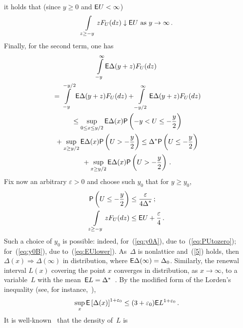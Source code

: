 \begin{multicols}{2}
it holds that (since $y\ge0$ and ${\sf E} U<\infty$)
 \begin{equation}
\int\limits_{z\ge-y}zF_{U}(dz)\downarrow{\sf E} U\,\,\mbox{as}\,\,
y\to\infty\,.\label{eq:EUlower}
\end{equation}
Finally, for the second term, one has
\begin{multline*}
\int\limits_{-y}^{\infty}{\sf E}\Delta(y+z)F_{U}(dz)  \\
{}=  \int\limits_{-y}^{-y/2}{\sf 
E}\Delta(y+z)F_{U}(dz)
 +\int\limits_{-y/2}^{\infty}{\sf E}\Delta(y+z)F_{U}(dz) \\
{} \le  \sup\limits_{0\le x\le y/2}{\sf E}\Delta(x){\sf P}\left(-y<U\le-\displaystyle\frac{\displaystyle y\mathstrut}{\displaystyle 2\mathstrut}\right)\\
{}+ \sup\limits_{x\ge y/2}{\sf E}\Delta(x){\sf P}\left(U>-\displaystyle\frac{\displaystyle y\mathstrut}{\displaystyle 2\mathstrut}\right)
\le \Delta^{*}{\sf P}\left(U\le-\displaystyle\frac{\displaystyle y\mathstrut}{\displaystyle 2\mathstrut}\right)\\
{}+ \sup\limits_{x\ge y/2}{\sf E}\Delta(x){\sf 
P}\left(U>-\displaystyle\frac{\displaystyle y\mathstrut}{\displaystyle 2\mathstrut}\right)\,.
\end{multline*}
 Fix now an arbitrary $\varepsilon>0$ and choose  such $y_{0}$ that
 for $y\ge y_{0}$,
\begin{align}
{\sf P}\left(U\le-\displaystyle\frac{\displaystyle y\mathstrut}{\displaystyle 2\mathstrut}\right) & \le \displaystyle\frac{\displaystyle \varepsilon\mathstrut}{\displaystyle 4\Delta^{*}\mathstrut}\,;\label{eq:y0A}\\
\int\limits_{z\ge-y}zF_{U}(dz) & \le  {\sf E} U+\displaystyle\frac{\displaystyle \varepsilon\mathstrut}{\displaystyle 4\mathstrut}\,.\label{eq:y0B}
\end{align}
Such a choice  of $y_{0}$ is possible: indeed, for~(\ref{eq:y0A}), due 
to~(\ref{eq:PUtozero}); for~(\ref{eq:y0B}), due to~(\ref{eq:EUlower}). 
As~$\Delta$ is nonlattice and~(\ref{5}) holds, then $\Delta(x)\Rightarrow 
\Delta(\infty)$ in distribution, where ${\sf E}\Delta(\infty)=\Delta_0$. 
Similarly,  the renewal interval $L(x)$ covering the point $x$  converges in 
distribution, as $x\to \infty$, to a variable~$L$  with the mean~${\sf E} 
L=\Delta^*$~\cite{Feller}.
 By the modified  form of the  Lorden's inequality (see, for instance,~\cite{Chang}),
\begin{equation*}
\sup_x{\sf E}\left[\Delta(x)\right]^{1+\varepsilon_0}\le (3+\varepsilon_0){\sf E}
L^{1+\varepsilon_0}\,. %
\end{equation*}
It is well-known~\cite{Feller}  that the density  of~$L$ is


\end{multicols}
